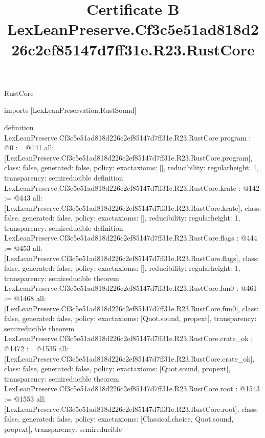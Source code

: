 \begin{lexlean}{RustCore}
\title{Certificate B LexLeanPreserve.Cf3c5e51ad818d226c2ef85147d7ff31e.R23.RustCore}
\begin{coremodule}
imports [LexLeanPreservation.RustSound]

definition LexLeanPreserve.Cf3c5e51ad818d226c2ef85147d7ff31e.R23.RustCore.program : @0 := @141 {
  all: [LexLeanPreserve.Cf3c5e51ad818d226c2ef85147d7ff31e.R23.RustCore.program],
  class: false,
  generated: false,
  policy: exact{axioms: []},
  reducibility: regular{height: 1},
  transparency: semireducible
}
definition LexLeanPreserve.Cf3c5e51ad818d226c2ef85147d7ff31e.R23.RustCore.krate : @142 := @443 {
  all: [LexLeanPreserve.Cf3c5e51ad818d226c2ef85147d7ff31e.R23.RustCore.krate],
  class: false,
  generated: false,
  policy: exact{axioms: []},
  reducibility: regular{height: 1},
  transparency: semireducible
}
definition LexLeanPreserve.Cf3c5e51ad818d226c2ef85147d7ff31e.R23.RustCore.flags : @444 := @453 {
  all: [LexLeanPreserve.Cf3c5e51ad818d226c2ef85147d7ff31e.R23.RustCore.flags],
  class: false,
  generated: false,
  policy: exact{axioms: []},
  reducibility: regular{height: 1},
  transparency: semireducible
}
theorem LexLeanPreserve.Cf3c5e51ad818d226c2ef85147d7ff31e.R23.RustCore.fun0 : @461 := @1468 {
  all: [LexLeanPreserve.Cf3c5e51ad818d226c2ef85147d7ff31e.R23.RustCore.fun0],
  class: false,
  generated: false,
  policy: exact{axioms: [Quot.sound, propext]},
  transparency: semireducible
}
theorem LexLeanPreserve.Cf3c5e51ad818d226c2ef85147d7ff31e.R23.RustCore.crate_ok : @1472 := @1535 {
  all: [LexLeanPreserve.Cf3c5e51ad818d226c2ef85147d7ff31e.R23.RustCore.crate_ok],
  class: false,
  generated: false,
  policy: exact{axioms: [Quot.sound, propext]},
  transparency: semireducible
}
theorem LexLeanPreserve.Cf3c5e51ad818d226c2ef85147d7ff31e.R23.RustCore.root : @1543 := @1553 {
  all: [LexLeanPreserve.Cf3c5e51ad818d226c2ef85147d7ff31e.R23.RustCore.root],
  class: false,
  generated: false,
  policy: exact{axioms: [Classical.choice, Quot.sound, propext]},
  transparency: semireducible
}


\end{coremodule}
\end{lexlean}
